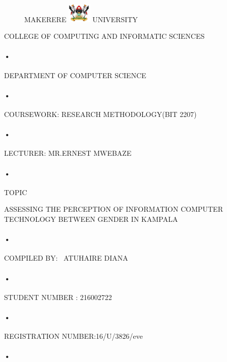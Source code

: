 \documentclass[11pt,A4paper]{article}
\begin{document}
\begin{titlepage}
  \begin{figure}[h]
  \centerline{\small MAKERERE 
  \includegraphics[width=0.1\textwidth]{muk_log} UNIVERSITY}
\end{figure}
\centerline{COLLEGE OF COMPUTING AND INFORMATIC SCIENCES}
\paragraph{•}
\centerline{DEPARTMENT OF COMPUTER SCIENCE\\}
\paragraph{•}

\centerline{COURSEWORK: RESEARCH METHODOLOGY(BIT 2207)\\}
\paragraph{•}

\centerline{LECTURER: MR.ERNEST MWEBAZE}
\paragraph{•}

\centerline{TOPIC\\}ASSESSING THE PERCEPTION OF INFORMATION COMPUTER TECHNOLOGY BETWEEN GENDER IN KAMPALA \\
\paragraph{•}
\centerline{COMPILED BY: \
 ATUHAIRE DIANA}
 \paragraph{•}
\centerline{STUDENT NUMBER : 216002722}
\paragraph{•}
\centerline{REGISTRATION NUMBER:16/U/3826/eve}
\paragraph{•}
\end{titlepage}
\tableofcontents
\newpage
{}
\end{document}
